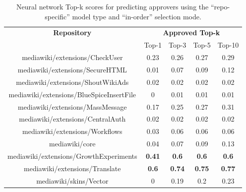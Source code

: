 \begin{table}[H]
\begin{center}
\begin{tabular}{@{}c c c c c@{}} 
\hline
    \textbf{Repository} &
    \multicolumn{4}{c}{\textbf{Approved Top-k}} \\
      & {Top-1} & {Top-3} & {Top-5} & {Top-10} \\
      \hline
mediawiki/extensions/CheckUser & 0.23 & 0.26 & 0.27 & 0.29 \\
mediawiki/extensions/SecureHTML & 0.01 & 0.07 & 0.09 & 0.12 \\
mediawiki/extensions/ShoutWikiAds & 0.02 & 0.02 & 0.02 & 0.02 \\
mediawiki/extensions/BlueSpiceInsertFile & 0 & 0.01 & 0.01 & 0.01 \\
mediawiki/extensions/MassMessage & 0.17 & 0.25 & 0.27 & 0.31 \\
mediawiki/extensions/CentralAuth & 0.02 & 0.02 & 0.02 & 0.02 \\
mediawiki/extensions/Workflows & 0.03 & 0.06 & 0.06 & 0.06 \\
mediawiki/core & 0.04 & 0.07 & 0.09 & 0.13 \\
mediawiki/extensions/GrowthExperiments & \textbf{0.41} & \textbf{0.6} & \textbf{0.6} & \textbf{0.6} \\
mediawiki/extensions/Translate & \textbf{0.6} & \textbf{0.74} & \textbf{0.75} & \textbf{0.77} \\
mediawiki/skins/Vector & 0 & 0.19 & 0.2 & 0.23 \\
\hline
\end{tabular}
\end{center}
\caption{\label{table:top-k-approved-neural-network}Neural network Top-k scores for predicting approvers using the ``repo-specific'' model type and ``in-order'' selection mode.}
\end{table}

